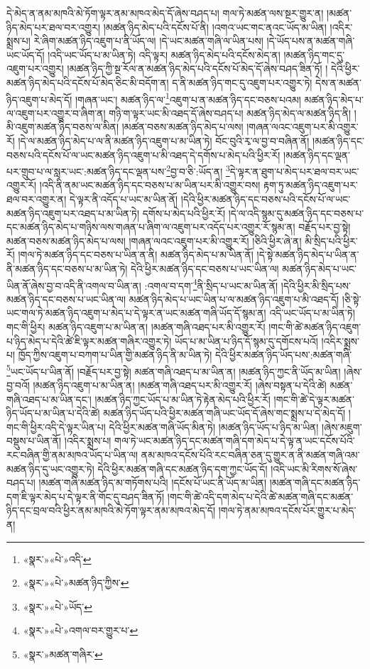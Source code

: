 དེ་མེད་ན་ནམ་མཁའི་མེ་ཏོག་ལྟར་ནམ་མཁའ་མེད་དོ་ཞེས་བཤད་པ། གལ་ཏེ་མཚན་ལས་སྔར་གྱུར་ན། །མཚན་ཉིད་མེད་པར་ཐལ་བར་འགྱུར། །མཚན་ཉིད་མེད་པའི་དངོས་པོ་ནི། །འགའ་ཡང་གང་ནའང་ཡོད་མ་ཡིན། །འདིར་སྨྲས་པ། རེ་ཞིག་མཚན་ཉིད་འཇུག་པ་ནི་ཡོད་ལ། །དེ་ཡང་མཚན་གཞི་ལ་ཡིན་པས། །དེ་ཡོད་པས་ན་མཚན་གཞི་ཡང་ཡོད་དོ། །འདི་ཡང་ཡོད་པ་མ་ཡིན་ཏེ། འདི་ལྟར། མཚན་ཉིད་མེད་པའི་དངོས་མེད་ན། །མཚན་ཉིད་གང་དུ་འཇུག་པར་འགྱུར། །མཚན་ཉིད་ཀྱི་སྔ་རོལ་ན་མཚན་ཉིད་མེད་པའི་དངོས་པོ་མེད་དོ་ཞེས་བཤད་ཟིན་ཏོ། །
དེའི་ཕྱིར་མཚན་ཉིད་མེད་པའི་དངོས་པོ་མེད་ཅིང་མི་བདོག་ན། ད་ནི་མཚན་ཉིད་གང་དུ་འཇུག་པར་འགྱུར་ཏེ། དེས་ན་མཚན་ཉིད་འཇུག་པ་མེད་དོ། །གཞན་ཡང་། མཚན་ཉིད་ལ་\footnote{«སྣར་»«པེ་»འདི་}འཇུག་པ་ན་མཚན་ཉིད་དང་བཅས་པའམ། མཚན་ཉིད་མེད་པ་ལ་འཇུག་པར་འགྱུར་བ་ཞིག་ན། གཉི་ག་ལྟར་ཡང་མི་འཐད་དོ་ཞེས་བཤད་པ། མཚན་ཉིད་མེད་ལ་མཚན་ཉིད་ནི། །མི་འཇུག་མཚན་ཉིད་བཅས་ལ་མིན། །མཚན་བཅས་མཚན་ཉིད་མེད་པ་ལས། །གཞན་ལའང་འཇུག་པར་མི་འགྱུར་རོ། །དེ་ལ་མཚན་ཉིད་མེད་པ་ལ་ནི་མཚན་ཉིད་འཇུག་པ་མ་ཡིན་ཏེ། བོང་བུའི་རྭ་ལ་བྱ་བ་བཞིན་ནོ། །མཚན་ཉིད་དང་བཅས་པའི་དངོས་པོ་ལ་ཡང་མཚན་ཉིད་འཇུག་པ་མི་འཐད་དེ་དགོས་པ་མེད་པའི་ཕྱིར་རོ། །མཚན་ཉིད་དང་ལྡན་པར་གྲུབ་པ་ལ་སླར་ཡང་:མཚན་ཉིད་དང་ལྡན་པས་\footnote{«སྣར་»«པེ་»མཚན་ཉིད་ཀྱིས་}བྱ་བ་ཅི་:ཡོད་ན། \footnote{«སྣར་»«པེ་»ཡོད་}དེ་ལྟར་ན་ཐུག་པ་མེད་པར་ཐལ་བར་ཡང་འགྱུར་རོ། །འདི་ནི་ནམ་ཡང་མཚན་ཉིད་དང་བཅས་པ་མ་ཡིན་པར་མི་འགྱུར་བས། རྟག་ཏུ་མཚན་ཉིད་འཇུག་པར་ཐལ་བར་འགྱུར་ན། དེ་ལྟར་ནི་འདོད་པ་ཡང་མ་ཡིན་ནོ། །དེའི་ཕྱིར་མཚན་ཉིད་དང་བཅས་པའི་དངོས་པོ་ལ་ཡང་མཚན་ཉིད་འཇུག་པར་འཐད་པ་མ་ཡིན་ཏེ། དགོས་པ་མེད་པའི་ཕྱིར་རོ། །དེ་ལ་འདི་སྙམ་དུ་མཚན་ཉིད་དང་བཅས་པ་དང་མཚན་ཉིད་མེད་པ་གཉིས་ལས་གཞན་པ་ཞིག་ལ་འཇུག་པར་འདོད་པར་འགྱུར་རོ་སྙམ་ན། བརྗོད་པར་བྱ་སྟེ། མཚན་བཅས་མཚན་ཉིད་མེད་པ་ལས། །གཞན་ལའང་འཇུག་པར་མི་འགྱུར་རོ། །ཅིའི་ཕྱིར་ཞེ་ན། མི་སྲིད་པའི་ཕྱིར་རོ། །གལ་ཏེ་མཚན་ཉིད་དང་བཅས་པ་ཡིན་ན་ནི། མཚན་ཉིད་མེད་པ་མ་ཡིན་ནོ། །དེ་སྟེ་མཚན་ཉིད་མེད་པ་ཡིན་ན་ནི་མཚན་ཉིད་དང་བཅས་པ་མ་ཡིན་ཏེ། དེའི་ཕྱིར་མཚན་ཉིད་དང་བཅས་པ་ཡང་ཡིན་ལ། མཚན་ཉིད་མེད་པ་ཡང་ཡིན་ནོ་ཞེས་བྱ་བ་འདི་ནི་འགལ་བ་ཡིན་ན། :འགལ་བ་དག་\footnote{«སྣར་»«པེ་»འགལ་བར་གྱུར་པ་}ནི་སྲིད་པ་ཡང་མ་ཡིན་ནོ། །དེའི་ཕྱིར་མི་སྲིད་པས་མཚན་ཉིད་དང་བཅས་པ་ཡང་ཡིན་ལ། མཚན་ཉིད་མེད་པ་ཡང་ཡིན་པ་ལ་མཚན་ཉིད་འཇུག་པ་མི་འཐད་དོ། །ཅི་སྟེ་ཡང་གལ་ཏེ་མཚན་ཉིད་འཇུག་པ་མེད་པ་དེ་ལྟར་ན་ཡང་མཚན་གཞི་ཡོད་དོ་སྙམ་ན། འདི་ཡང་ཡོད་པ་མ་ཡིན་ཏེ། གང་གི་ཕྱིར། མཚན་ཉིད་འཇུག་པ་མ་ཡིན་ན། །མཚན་གཞི་འཐད་པར་མི་འགྱུར་རོ། །གང་གི་ཚེ་མཚན་ཉིད་འཇུག་པ་ཉིད་མེད་པ་དེའི་ཚེ་ཇི་ལྟར་མཚན་གཞིར་འགྱུར་ཏེ། ཡོད་པ་མ་ཡིན་པ་ཉིད་དོ་སྙམ་དུ་དགོངས་པའོ། །འདིར་སྨྲས་པ། ཁྱོད་ཀྱིས་འཇུག་པ་བཀག་པ་ཡིན་གྱི་མཚན་ཉིད་ནི་མ་ཡིན་ཏེ། དེའི་ཕྱིར་མཚན་ཉིད་ཡོད་པས་:མཚན་གཞི་\footnote{«སྣར་»མཚན་གཞིར་}ཡང་ཡོད་པ་ཡིན་ནོ། །བརྗོད་པར་བྱ་སྟེ། མཚན་གཞི་འཐད་པ་མ་ཡིན་ན། །མཚན་ཉིད་ཀྱང་ནི་ཡོད་མ་ཡིན། །ཞེས་བྱ་བའོ། །མཚན་ཉིད་འཇུག་པ་མ་ཡིན་ན། །མཚན་གཞི་འཐད་པར་མི་འགྱུར་རོ། །ཞེས་བསྟན་པ་དེའི་ཚེ། མཚན་གཞི་འཐད་པ་མ་ཡིན་དང་། །མཚན་ཉིད་ཀྱང་ཡོད་པ་མ་ཡིན་ཏེ་རྟེན་མེད་པའི་ཕྱིར་རོ། །གང་གི་ཚེ་དེ་ལྟར་མཚན་ཉིད་ཡོད་པ་མ་ཡིན་པ་དེའི་ཚེ། མཚན་ཉིད་ཡོད་པའི་ཕྱིར་མཚན་གཞི་ཡང་ཡོད་དོ་ཞེས་གང་སྨྲས་པ་དེ་མེད་དོ། །གང་གི་ཕྱིར་འདི་དེ་ལྟར་ཡིན་པ། དེའི་ཕྱིར་མཚན་གཞི་ཡོད་མིན་ཏེ། །མཚན་ཉིད་ཡོད་པ་ཉིད་མ་ཡིན། །ཞེས་མཇུག་བསྡུས་པ་ཡིན་ནོ། །འདིར་སྨྲས་པ། གལ་ཏེ་ཡང་མཚན་ཉིད་དང་མཚན་གཞི་དག་མེད་པ་དེ་ལྟ་ན་ཡང་དངོས་པོའི་རང་བཞིན་གྱི་ནམ་མཁའ་ཡོད་པ་ཡིན་ལ། ནམ་མཁའ་དངོས་པོའི་རང་བཞིན་ཅན་དུ་གྱུར་ན་ནི་མཚན་གཞི་འམ་མཚན་ཉིད་དུ་ཡང་འགྱུར་ཏེ། དེའི་ཕྱིར་མཚན་གཞི་དང་མཚན་ཉིད་དག་ཀྱང་ཡོད་དོ། །འདི་ཡང་མི་རིགས་སོ་ཞེས་བཤད་པ། །མཚན་གཞི་མཚན་ཉིད་མ་གཏོགས་པའི། །དངོས་པོ་ཡང་ནི་ཡོད་མ་ཡིན། །མཚན་གཞི་དང་མཚན་ཉིད་དག་ཇི་ལྟར་མེད་པ་དེ་ལྟར་ནི་གོང་དུ་བཤད་ཟིན་ཏོ། །གང་གི་ཚེ་འདི་དག་མེད་པ་དེའི་ཚེ་མཚན་གཞི་དང་མཚན་ཉིད་དང་བྲལ་བའི་ཕྱིར་ནམ་མཁའི་མེ་ཏོག་ལྟར་ནམ་མཁའ་མེད་དོ། །གལ་ཏེ་ནམ་མཁའ་དངོས་པོར་གྱུར་པ་མེད་ན། 